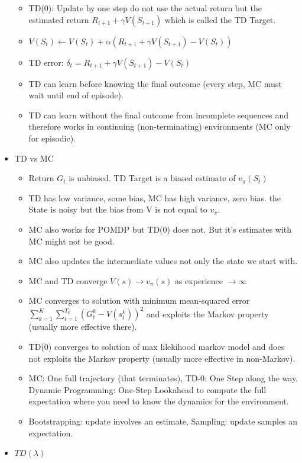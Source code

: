 \begin{itemize}[noitemsep,nolistsep]
\begin{itemize}[noitemsep,nolistsep]
		\item TD(0): Update by one step do not use the actual return but the estimated return $R_{t+1} + \gamma V(S_{t+1})$ which is called the TD Target.
		\item $V(S_t) \leftarrow V(S_t) + \alpha (R_{t+1} + \gamma V(S_{t+1}) - V(S_t))$
		\item TD error: $\delta_t = R_{t+1} + \gamma V(S_{t+1}) - V(S_t)$
		\item TD can learn before knowing the final outcome (every step, MC must wait until end of episode).
		\item TD can learn without the final outcome from incomplete sequences and therefore works in continuing (non-terminating) environments (MC only for episodic).
	\end{itemize}
	\item TD vs MC
		\begin{itemize}[noitemsep,nolistsep]
		\item Return $G_t$ is unbiased. TD Target is a biased estimate of $v_\pi (S_t)$
		\item TD has low variance, some bias, MC has high variance, zero bias.  the State is noisy but the bias from V is not equal to $v_\pi$.
		\item MC also works for POMDP but TD(0) does not. But it's estimates with MC might not be good. 
		\item MC also updates the intermediate values not only the state we start with.
		\item MC and TD converge $V(s) \rightarrow v_\pi(s)$ as experience $\rightarrow \infty$
		\item MC converges to solution with minimum mean-squared error $\sum_{k=1}^K \sum_{t=1}^{T_k} (G_t^k - V(s_t^k))^2$ and exploits the Markov property (usually more effective there).
		\item TD(0) converges to solution of max lilekihood markov model and does not exploits the Markov property (usually more effective in non-Markov).
		\item MC: One full trajectory (that terminates), TD-0: One Step along the way. Dynamic Programming: One-Step Lookahead to compute the full expectation where you need to know the dynamics for the environment.
		\item Bootstrapping: update involves an estimate, Sampling: update samples an expectation.
	\end{itemize}
	\item $TD(\lambda)$
	\begin{itemize}

\end{itemize}
\end{itemize}
